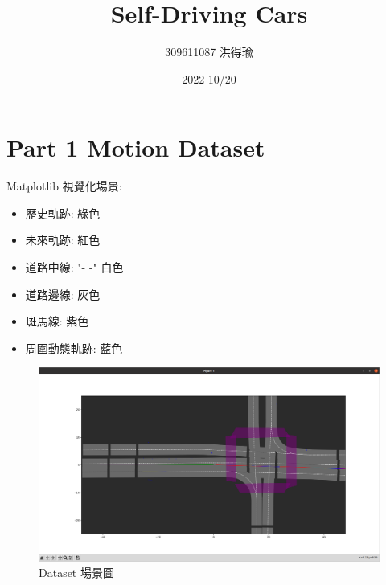\documentclass{article}
\title{Self-Driving Cars}
\author{309611087 洪得瑜}
\date{2022 10/20}
\begin{document}
\maketitle
\section{Part 1 Motion Dataset}
Matplotlib 視覺化場景:
\begin{itemize}
	\item 歷史軌跡: 綠色
	\item 未來軌跡: 紅色 
	\item 道路中線: "- -" 白色
	\item 道路邊線: 灰色
	\item 斑馬線: 紫色
	\item 周圍動態軌跡: 藍色
\end{itemize}
\begin{figure}[H]
	\centering
	\includegraphics[scale=0.3]{./lane.png}
	\caption{Dataset 場景圖}
\end{figure}
\end{document}

